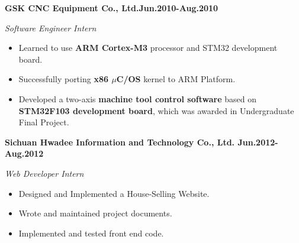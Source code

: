 \documentclass{myres}
\begin{document}
{
	\textbf{GSK CNC Equipment Co., Ltd.\hfill Jun.2010-Aug.2010}
	\par
	{\it Software Engineer Intern}
  \begin{itemize}[topsep=0pt, leftmargin=0.2in] \itemsep -5pt
			\item Learned to use \textbf{ARM Cortex-M3} processor and STM32 development board.
			\item Successfully porting \textbf{x86 $\mu$C/OS} kernel to ARM Platform.
			\item Developed a two-axis \textbf{machine tool control software} based on
				\textbf{STM32F103 development board}, which was awarded in Undergraduate Final Project.
	\end{itemize}
	\par
	\smallskip
	\textbf{Sichuan Hwadee Information and Technology Co., Ltd. \hfill Jun.2012-Aug.2012}
	\par
	{\it Web Developer Intern}
  \begin{itemize}[topsep=0pt, leftmargin=0.2in] \itemsep -5pt
		\item Designed and Implemented a House-Selling Website.
		\item Wrote and maintained project documents.
	  \item Implemented and tested front end code.
	\end{itemize}
	\par
}
\end{document}
